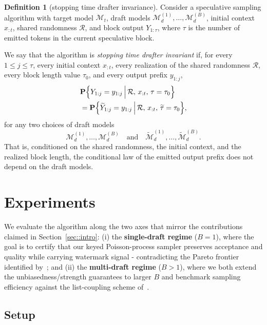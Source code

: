 \documentclass{article}
\theoremstyle{plain}
\theoremstyle{definition}
\newtheorem{definition}[theorem]{Definition}
\begin{document}
\begin{definition}[stopping time drafter invariance]
\label{def:block_length_drafter_invariance}
Consider a speculative sampling algorithm with target model $\mathcal{M}_t$,
draft models $\mathcal{M}_d^{(1)},\ldots,\mathcal{M}_d^{(B)}$, initial context $x_{:t}$,
shared randomness $\mathcal{R}$, and block output $Y_{1:\tau}$, where $\tau$ is the number
of emitted tokens in the current speculative block.

We say that the algorithm is \emph{stopping time drafter invariant} if, for every $1\le j\le \tau$,
every initial context $x_{:t}$, every realization of the shared randomness $\mathcal{R}$,
every block length value $\tau_0$, and every output prefix $y_{1:j}$,
\begin{align*}
&\mathbf{P}\Bigl\{
Y_{1:j}=y_{1:j}\,\Big|\,\mathcal{R},\,x_{:t},\,\tau=\tau_0
\Bigr\} \\
&=
\mathbf{P}\Bigl\{
\widetilde{Y}_{1:j}=y_{1:j}\,\Big|\,\mathcal{R},\,x_{:t},\,\widetilde{\tau}=\tau_0
\Bigr\},
\end{align*}
for any two choices of draft models
\[
\mathcal{M}_d^{(1)},\ldots,\mathcal{M}_d^{(B)}
\quad\text{and}\quad
\widetilde{\mathcal{M}}_d^{(1)},\ldots,\widetilde{\mathcal{M}}_d^{(B)}.
\]
That is, conditioned on the shared randomness, the initial context, and the realized block length,
the conditional law of the emitted output prefix does not depend on the draft models.
\end{definition}



\section{Experiments}
\label{sec:experiments}

We evaluate the algorithm along the two axes that mirror the contributions
claimed in Section~\ref{sec::intro}: (i) the \textbf{single-draft regime}
($B=1$), where the goal is to certify that our keyed Poisson-process sampler
preserves acceptance and quality while carrying watermark signal -
contradicting the Pareto frontier identified by~\citet{hu2024inevitable};
and (ii) the \textbf{multi-draft regime} ($B>1$), where we both
extend the unbiasedness/strength guarantees to larger $B$ and benchmark
sampling efficiency against the list-coupling scheme
of~\citet{rowan2025list}.

\subsection{Setup}
\label{sec:setup}
\end{document}
